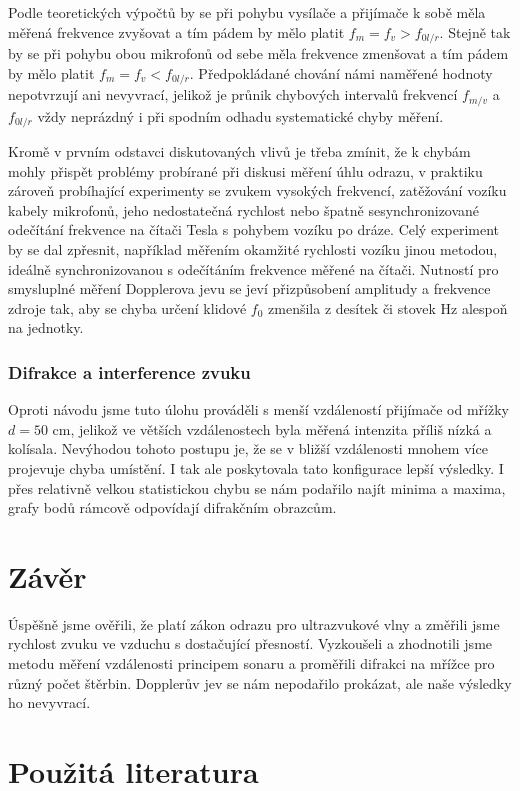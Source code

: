 \documentclass[english]{article}
\begin{document}
		Podle teoretických výpočtů by se při pohybu vysílače a přijímače k sobě měla měřená frekvence zvyšovat a tím pádem by mělo platit $f_m = f_v > f_{0l/r}$. Stejně tak by se při pohybu obou mikrofonů od sebe měla frekvence zmenšovat a tím pádem by mělo platit $f_m = f_v < f_{0l/r}$. Předpokládané chování námi naměřené hodnoty nepotvrzují ani nevyvrací, jelikož je průnik chybových intervalů frekvencí $f_{m/v}$ a $f_{0l/r}$ vždy neprázdný i při spodním odhadu systematické chyby měření.
		
		Kromě v prvním odstavci diskutovaných vlivů je třeba zmínit, že k chybám mohly přispět problémy probírané při diskusi měření úhlu odrazu, v praktiku zároveň probíhající experimenty se zvukem vysokých frekvencí, zatěžování vozíku kabely mikrofonů, jeho nedostatečná rychlost nebo špatně sesynchronizované odečítání frekvence na čítači Tesla s pohybem vozíku po dráze. Celý experiment by se dal zpřesnit, například měřením okamžité rychlosti vozíku jinou metodou, ideálně synchronizovanou s odečítáním frekvence měřené na čítači. Nutností pro smysluplné měření Dopplerova jevu se jeví přizpůsobení amplitudy a frekvence zdroje tak, aby se chyba určení klidové $f_0$ zmenšila z desítek či stovek Hz alespoň na jednotky. 

	\subsubsection{Difrakce a interference zvuku}
		Oproti návodu \cite{bib:zadani} jsme tuto úlohu prováděli s menší vzdáleností přijímače od mřížky $d = 50$ cm, jelikož ve větších vzdálenostech byla měřená intenzita příliš nízká a kolísala. Nevýhodou tohoto postupu je, že se v bližší vzdálenosti mnohem více projevuje chyba umístění. I tak ale poskytovala tato konfigurace lepší výsledky. I přes relativně velkou statistickou chybu se nám podařilo najít minima a maxima, grafy bodů rámcově odpovídají difrakčním obrazcům.
		
\section{Závěr}
	Úspěšně jsme ověřili, že platí zákon odrazu pro ultrazvukové vlny a změřili jsme rychlost zvuku ve vzduchu s dostačující přesností. Vyzkoušeli a zhodnotili jsme metodu měření vzdálenosti principem sonaru a proměřili difrakci na mřížce pro různý počet štěrbin. Dopplerův jev se nám nepodařilo prokázat, ale naše výsledky ho nevyvrací.


\section {Použitá literatura}
\begingroup
\renewcommand{\section}[2]{}
\end{document}
